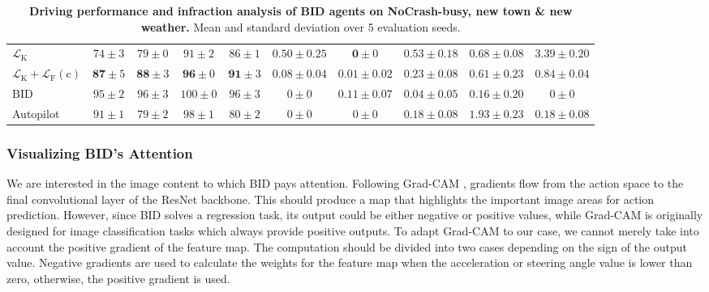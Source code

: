 \begin{table}
\begin{tabular}{lccccccccc}
		$\mathcal{L}_\text{K}$
		& $74\pm3$ & $79\pm0$ & $91\pm2$ & $86\pm1$ 
		& $0.50\pm0.25$ & $\mathbf{0}\pm0$ & $0.53\pm0.18$ & $0.68\pm0.08$ & $3.39\pm0.20$ \\
		$\mathcal{L}_\text{K}+\mathcal{L}_\text{F}(\text{c})$
		& $\mathbf{87} \pm 5$ & $\mathbf{88} \pm 3$ & $\mathbf{96} \pm 0$ & $\mathbf{91} \pm 3$ 
		& $\mathbf{0.08} \pm 0.04$ & $0.01 \pm 0.02$ & $\mathbf{0.23} \pm 0.08$ & $\mathbf{0.61} \pm 0.23$ & $\mathbf{0.84} \pm 0.04$ \\
		\cmidrule(lr){1-1}\cmidrule(lr){2-5}\cmidrule(lr){6-10}
		BID
		& $95 \pm 2$ & $96 \pm 3$ & $100 \pm 0$ & $96 \pm 3$ 
		& $0 \pm 0$ & $0.11 \pm 0.07$ & $0.04 \pm 0.05$ & $0.16 \pm 0.20$ & $0 \pm 0$ \\
		Autopilot
		& $91 \pm 1$ & $79 \pm 2$ & $98 \pm 1$ & $80 \pm 2$ 
		& $0 \pm 0$ & $0 \pm 0$ & $0.18 \pm 0.08$ & $1.93 \pm 0.23$ & $0.18 \pm 0.08$\\
		\bottomrule
	\end{tabular}
	\vspace{-1ex}
	\caption{\textbf{Driving performance and infraction analysis of BID agents on NoCrash-busy, new town \& new weather.} 
		Mean and standard deviation over 5 evaluation seeds.}
	\vspace{-2.5ex}
	\label{table:infraction}
\end{table}


\subsubsection{Visualizing BID's Attention}
\label{sec:Visualization}
\hspace{1pc}We are interested in the image content to which BID pays attention. 
Following Grad-CAM \cite{Selvaraju:2017}, gradients flow from the action space to the final convolutional layer of the ResNet backbone. 
This should produce a map that highlights the important image areas for action prediction. 
However, since BID solves a regression task, its output could be either negative or positive values, while Grad-CAM is originally designed for image classification tasks which always provide positive outputs. 
To adapt Grad-CAM to our case, we cannot merely take into account the positive gradient of the feature map. 
The computation should be divided into two cases depending on the sign of the output value. 
Negative gradients are used to calculate the weights for the feature map when the acceleration or steering angle value is lower than zero, otherwise, the positive gradient is used.


